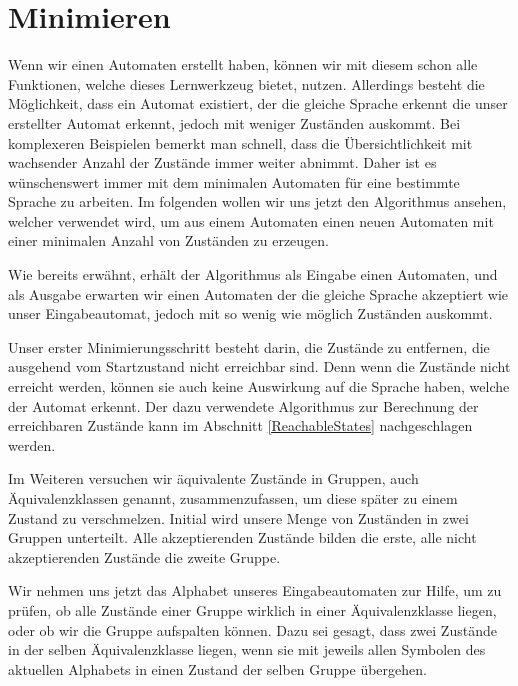 

\chapter{Minimieren}\label{Minimize}

Wenn wir einen Automaten erstellt haben, können wir mit diesem schon alle
Funktionen, welche dieses Lernwerkzeug bietet, nutzen. Allerdings besteht die
Möglichkeit, dass ein Automat existiert, der die gleiche Sprache erkennt die
unser erstellter Automat erkennt, jedoch mit weniger Zuständen auskommt. Bei
komplexeren Beispielen bemerkt man schnell, dass die Übersichtlichkeit mit
wachsender Anzahl der Zustände immer weiter abnimmt. Daher ist es wünschenswert
immer mit dem minimalen Automaten für eine bestimmte Sprache zu arbeiten. Im
folgenden wollen wir uns jetzt den Algorithmus ansehen, welcher verwendet wird,
um aus einem Automaten einen neuen Automaten mit einer minimalen Anzahl von
Zuständen zu erzeugen.\vspace{10pt}

Wie bereits erwähnt, erhält der Algorithmus als Eingabe einen Automaten, und als
Ausgabe erwarten wir einen Automaten der die gleiche Sprache akzeptiert wie
unser Eingabeautomat, jedoch mit so wenig wie möglich Zuständen
auskommt.\vspace{10pt}

Unser erster Minimierungsschritt besteht darin, die Zustände zu entfernen, die
ausgehend vom Startzustand nicht erreichbar sind. Denn wenn die Zustände nicht
erreicht werden, können sie auch keine Auswirkung auf die Sprache haben, welche
der Automat erkennt. Der dazu verwendete Algorithmus zur Berechnung der
erreichbaren Zustände kann im Abschnitt \ref{ReachableStates} nachgeschlagen
werden.\vspace{10pt}

Im Weiteren versuchen wir äquivalente Zustände in Gruppen, auch
Äquivalenz\-klassen genannt, zusammenzufassen, um diese später zu einem Zustand
zu verschmelzen. Initial wird unsere Menge von Zuständen in zwei Gruppen
unterteilt. Alle akzeptierenden Zustände bilden die erste, alle nicht
akzeptierenden Zustände die zweite Gruppe.\vspace{10pt}

Wir nehmen uns jetzt das Alphabet unseres Eingabeautomaten zur Hilfe, um zu
prüfen, ob alle Zustände einer Gruppe wirklich in einer Äquivalenzklasse
liegen, oder ob wir die Gruppe aufspalten können. Dazu sei gesagt, dass zwei
Zustände in der selben Äquivalenzklasse liegen, wenn sie mit jeweils allen
Symbolen des aktuellen Alphabets in einen Zustand der selben Gruppe
übergehen.\vspace{10pt}

